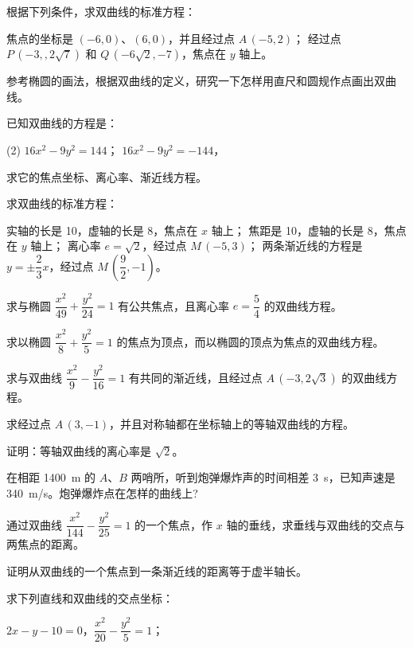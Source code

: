 \begin{Exercise}
  \begin{question}
    \item 根据下列条件，求双曲线的标准方程：
    \begin{tasks}
      \task 焦点的坐标是 $(-6,0)$、$(6,0)$，并且经过点 $A\,(-5,2)$；
      \task 经过点 $P\,(-3,,2\sqrt{7})$ 和 $Q\,(-6\sqrt{2},-7)$，焦点在 $y$ 轴上。
    \end{tasks}
    \item 参考椭圆的画法，根据双曲线的定义，研究一下怎样用直尺和圆规作点画出双曲线。
    \item 已知双曲线的方程是：
    \begin{tasks}(2)
      \task $16x^2-9y^2=144$；
      \task $16x^2-9y^2=-144$，
    \end{tasks}
    求它的焦点坐标、离心率、渐近线方程。
    \item 求双曲线的标准方程：
    \begin{tasks}
      \task 实轴的长是 10，虚轴的长是 8，焦点在 $x$ 轴上；
      \task 焦距是 10，虚轴的长是 8，焦点在 $y$ 轴上；
      \task 离心率 $e=\sqrt{2}$，经过点 $M\,(-5,3)$；
      \task 两条渐近线的方程是 $y=\pm\dfrac{2}{3}x$，经过点 $M\,(\dfrac{9}{2},-1)$。
    \end{tasks}
    \item 求与椭圆 $\dfrac{x^2}{49}+\dfrac{y^2}{24}=1$ 有公共焦点，且离心率 $e= \dfrac{5}{4}$ 的双曲线方程。
    \item 求以椭圆 $\dfrac{x^2}{8}+\dfrac{y^2}{5}=1$ 的焦点为顶点，而以椭圆的顶点为焦点的双曲线方程。
    \item 求与双曲线 $\dfrac{x^2}{9}-\dfrac{y^2}{16}=1$ 有共同的渐近线，且经过点 $A\,(-3,2\sqrt{3})$ 的双曲线方程。
    \item 求经过点 $A\,(3,-1)$，并且对称轴都在坐标轴上的等轴双曲线的方程。
    \item 证明：等轴双曲线的离心率是 $\sqrt{2}$。
    \item 在相距 \qty{1400}{m} 的 $A$、$B$ 两哨所，听到炮弹爆炸声的时间相差 \qty{3}{s}，已知声速是 \qty{340}{m/s}。炮弹爆炸点在怎样的曲线上?
    \item 通过双曲线 $\dfrac{x^2}{144}-\dfrac{y^2}{25}=1$ 的一个焦点，作 $x$ 轴的垂线，求垂线与双曲线的交点与两焦点的距离。
    \item 证明从双曲线的一个焦点到一条渐近线的距离等于虚半轴长。
    \item 求下列直线和双曲线的交点坐标：
    \begin{tasks}
      \task $2x-y-10=0$，$\dfrac{x^2}{20}-\dfrac{y^2}{5}=1$；

\end{tasks}
\end{question}
\end{Exercise}
